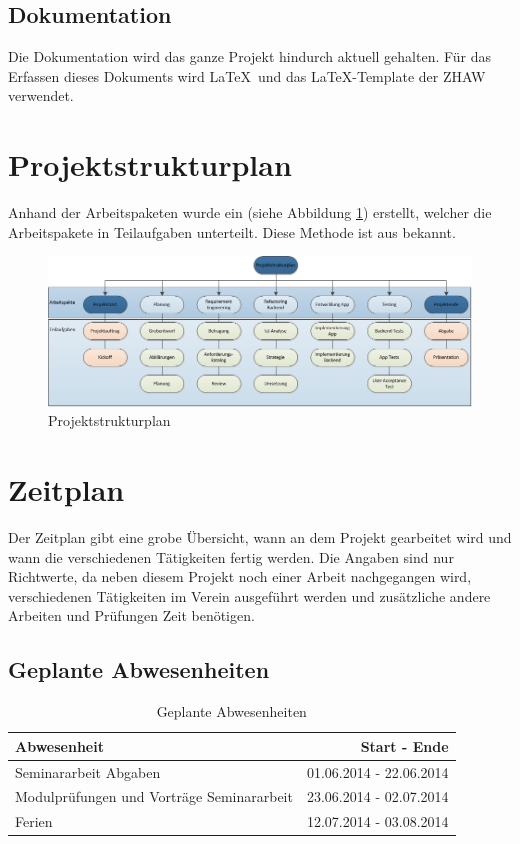 \subsection{Dokumentation}\label{dokumentation}
Die Dokumentation wird das ganze Projekt hindurch aktuell gehalten. Für das Erfassen dieses Dokuments wird \LaTeX\ und das \LaTeX-Template der ZHAW verwendet.


\newpage
\section{Projektstrukturplan}\label{projektstrukturplan}
Anhand der Arbeitspaketen wurde ein  (siehe Abbildung \ref{fig:psp}) erstellt, welcher die Arbeitspakete in Teilaufgaben unterteilt. Diese Methode ist aus \cite{proj_mgmt_book} bekannt.
\begin{figure}[h]
\centering
\includegraphics[scale=0.7]{images/visio/PSP.png}
\caption{Projektstrukturplan}
\label{fig:psp}
\end{figure}



\section{Zeitplan}\label{zeitplan}
Der Zeitplan gibt eine grobe Übersicht, wann an dem Projekt gearbeitet wird und wann die verschiedenen Tätigkeiten fertig werden. Die Angaben sind nur Richtwerte, da neben diesem Projekt noch einer Arbeit nachgegangen wird, verschiedenen Tätigkeiten im Verein ausgeführt werden und zusätzliche andere Arbeiten und Prüfungen Zeit benötigen.

\subsection{Geplante Abwesenheiten}
\begin{table}[ht]
\centering
  \begin{tabular}{ l | r }
	\hline
	\rowcolor{gray}
	Abwesenheit							&	Start - Ende	\\ \hline
	Seminararbeit Abgaben					&	01.06.2014 - 22.06.2014	\\ \hline
	Modulprüfungen und Vorträge Seminararbeit		&	23.06.2014 - 02.07.2014	\\ \hline
	Ferien								&	12.07.2014 - 03.08.2014	\\ \hline
  \end{tabular}
   \caption{Geplante Abwesenheiten}\label{table:holidays}
\end{table}

